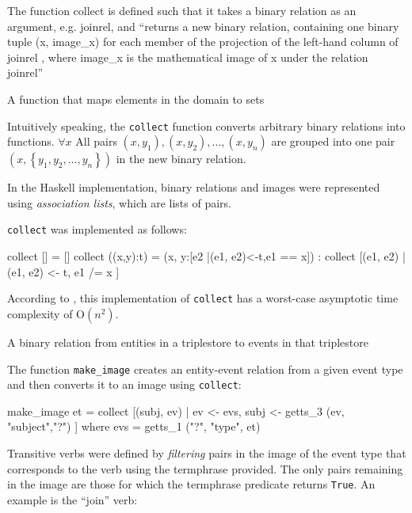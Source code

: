 \documentclass[../main.tex]{subfiles}
\begin{document}
\begin{definition}
The function collect is defined such that it takes a binary relation as an
argument, e.g. joinrel, and ``returns a new binary relation, containing one binary tuple
(x, image\_x) for each member of the projection of the left-hand column of joinrel
, where image\_x is the mathematical image of x under the relation joinrel''\cite{frost2014denotational}
\end{definition}

\begin{definition}
  A function that maps elements in the domain to sets
\end{definition}

Intuitively speaking, the \texttt{collect} function converts arbitrary binary
relations into functions.  $\forall x$ All pairs $(x, y_1), (x, y_2), ..., (x,
y_n)$ are grouped into one pair $(x, \left\{y_1, y_2, ..., y_n\right\})$ in the new binary
relation.

In the Haskell implementation, binary relations and images were represented using {\em association
lists}, which are lists of pairs\cite{frost2014denotational}.

\texttt{collect} was implemented as follows:

\begin{code}
	collect [] = []
	collect ((x,y):t) = (x, y:[e2 |(e1, e2)<-t,e1 == x])
		: collect [(e1, e2) | (e1, e2) <- t, e1 /= x ]
\end{code}

According to \cite{agboola2015extensible}, this implementation of \texttt{collect} has a worst-case asymptotic time complexity of
O$(n^2)$.

\begin{definition}
  A binary relation from entities in a triplestore to events in that triplestore
\end{definition}

The function \texttt{make\_image} creates an entity-event relation from a given event type and then converts it to an image using \texttt{collect}:

\begin{code}
  make_image et = collect
    [(subj, ev) | ev <- evs, subj <- getts_3 (ev, "subject","?") ]
	  where evs = getts_1 ("?", "type",  et)
\end{code}

Transitive verbs were defined by {\em filtering} pairs in the image of the event
type that corresponds to the verb using the termphrase provided.  The only pairs remaining in the image are those
for which the termphrase predicate returns \texttt{True}.  An example is the
``join'' verb:
\end{document}

